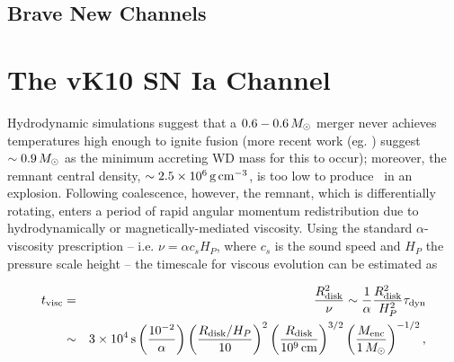 \subsection{Brave New Channels}

\section{The vK10 SN Ia Channel}



Hydrodynamic simulations \citep{loreig09} suggest that a $0.6-0.6\,\Msun$ merger never achieves temperatures high enough to ignite fusion (more recent work (eg. \citep{pakm+11, dan+12}) suggest $\sim0.9\,\Msun$ as the minimum accreting WD mass for this to occur); moreover, the remnant central density, $\sim2.5\times10^6\,\gcc$, is too low to produce \Ni\ in an explosion.  Following coalescence, however, the remnant, which is differentially rotating, enters a period of rapid angular momentum redistribution due to hydrodynamically or magnetically-mediated viscosity.  Using the standard $\alpha$-viscosity prescription \cite{shaks73} -- i.e. $\nu = \alpha c_s H_P$, where $c_s$ is the sound speed and $H_P$ the pressure scale height -- the timescale for viscous evolution can be estimated as

\begin{eqnarray}
t_\mrm{visc} &=& \frac{R_\mrm{disk}^2}{\nu} \sim \frac{1}{\alpha}\frac{R_\mrm{disk}^2}{H_P^2}\taudyn \nonumber \\
			&\sim& 3\times10^4\,\mrm{s}\left(\frac{10^{-2}}{\alpha}\right)\left(\frac{R_\mrm{disk}/H_P}{10}\right)^2\left(\frac{R_\mrm{disk}}{10^9\,\mrm{cm}}\right)^{3/2}\left(\frac{M_\mrm{enc}}{1\,\Msun}\right)^{-1/2},
\end{eqnarray}


